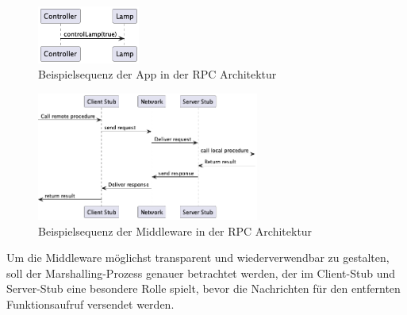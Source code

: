 \documentclass[../vs-script-first-v01.tex]{subfiles}
\begin{document}
 \begin{figure}[!ht]
  \centering
  \includegraphics[width=0.30\textwidth]{fig/uml/rpc-app-seq.png}
  \caption{Beispielsequenz der App in der RPC Architektur}
  \label{fig:rpc-app-seq-rpc}
\end{figure}


 \begin{figure}[!ht]
  \centering
  \includegraphics[width=0.65\textwidth]{fig/uml/rpc-middleware-seq.png}
  \caption{Beispielsequenz der Middleware in der RPC Architektur}
  \label{fig:rpc-middleware-seq-rpc}
\end{figure}

Um die Middleware möglichst transparent und wiederverwendbar zu gestalten, soll der Marshalling-Prozess genauer betrachtet werden, der im Client-Stub und Server-Stub eine besondere Rolle spielt, bevor die Nachrichten für den entfernten Funktionsaufruf versendet werden. 
\end{document}
